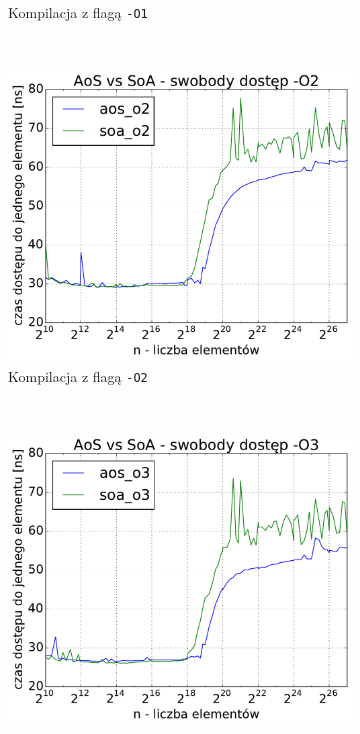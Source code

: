 \begin{figure}[!h]
\begin{subfigure}[c]{0.45\textwidth}
        \caption{Kompilacja z flagą \texttt{-O1}}
    \end{subfigure}
    \\
    \vspace{0.55cm}
    \begin{subfigure}[c]{0.45\textwidth}
        \centering
        \includegraphics[width=\textwidth]{images/benchs/random_access_aos_vs_soa_O2}
        \caption{Kompilacja z flagą \texttt{-O2}}
    \end{subfigure}
    ~
    \begin{subfigure}[c]{0.45\textwidth}
        \centering
        \includegraphics[width=\textwidth]{images/benchs/random_access_aos_vs_soa_O3}

\end{subfigure}
\end{figure}
